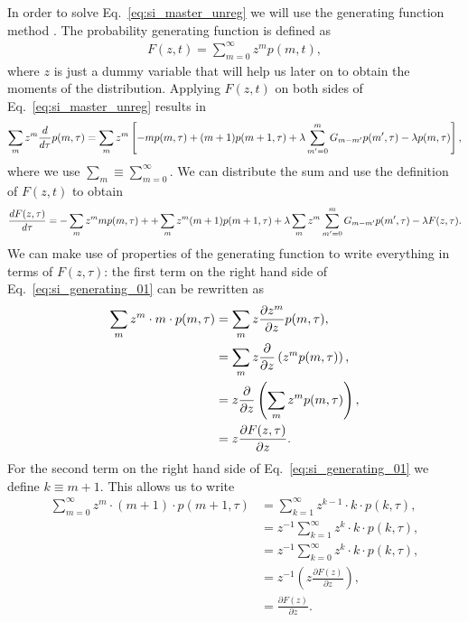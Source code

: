 In order to solve Eq.~\ref{eq:si_master_unreg} we will use the generating
function method . The probability generating function is defined
as
\begin{align}
F(z,t) = \sum_{m=0}^\infty z^m p(m,t),
\end{align}
where $z$ is just a dummy variable that will help us later on to obtain the
moments of the distribution. Applying $F(z, t)$ on both sides of 
Eq.~\ref{eq:si_master_unreg} results in
\begin{equation}
\sum_m z^m {d \over d\tau} p(m, \tau) = 
\sum_m z^m \left[ 
- m p(m, \tau) 
+ (m + 1) p(m + 1, \tau) 
+ \lambda \sum_{m' = 0}^m G_{m-m'} p(m', \tau) - \lambda p(m, \tau)
\right],
\end{equation}
where we use $\sum_m \equiv \sum_{m=0}^\infty$. We can distribute the sum and
use the definition of $F(z, t)$ to obtain
\begin{equation}
{d F(z, \tau) \over d\tau} =
- \sum_m z^m m p(m, \tau) +
+ \sum_m z^m (m + 1) p(m + 1, \tau)
+ \lambda \sum_m z^m \sum_{m'=0}^m G_{m-m'} p(m', \tau)
- \lambda F(z, \tau).
\label{eq:si_generating_01}
\end{equation}
We can make use of properties of the generating function to write everything in
terms of $F(z, \tau)$: the first term on the right hand side of
Eq.~\ref{eq:si_generating_01} can be rewritten as
\begin{align}
\sum_{m} z^{m} \cdot m \cdot p(m, \tau) &=
\sum_{m} z \frac{\partial z^{m}}{\partial z} p(m, \tau), \\
&=\sum_{m} z \frac{\partial}{\partial z}\left(z^{m} p(m, \tau)\right), \\
&=z \frac{\partial}{\partial z}\left(\sum_{m} z^{m} p(m, \tau)\right), \\
&= z {\partial F(z, \tau) \over \partial z}.
\end{align}
For the second term on the right hand side of Eq.~\ref{eq:si_generating_01} we
define $k \equiv m + 1$. This allows us to write
\begin{align}
\sum_{m=0}^{\infty} z^{m} \cdot(m+1) \cdot p(m+1, \tau) &=
\sum_{k=1}^{\infty} z^{k-1} \cdot k \cdot p(k, \tau), \\
&=z^{-1} \sum_{k=1}^{\infty} z^{k} \cdot k \cdot p(k, \tau), \\
&=z^{-1} \sum_{k=0}^{\infty} z^{k} \cdot k \cdot p(k, \tau), \\
&=z^{-1} \left(z \frac{\partial F(z)}{\partial z}\right), \\
&=\frac{\partial F(z)}{\partial z}.
\end{align}
